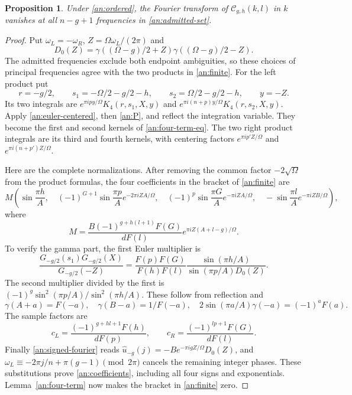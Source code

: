 \documentclass[11pt]{article}
\numberwithin{equation}{section}
\newtheorem{proposition}[theorem]{Proposition}
\theoremstyle{definition}
\theoremstyle{remark}
\begin{document}
\begin{proposition}\label{an:admitted}
Under \eqref{an:ordered}, the Fourier transform of
$\mathcal C_{g,h}(k,l)$ in $k$ vanishes at all $n-g+1$ frequencies
in \eqref{an:admitted-set}.
\end{proposition}

\begin{proof}
Put $\omega_L=-\omega_R$, $Z=\Omega\omega_L/(2\pi)$ and
\[
 D_0(Z)=\gamma((\Omega-g)/2+Z)\gamma((\Omega-g)/2-Z).
\]
The admitted frequencies exclude both endpoint ambiguities, so these
choices of principal frequencies agree with the two products in
\eqref{an:finite}.  For the left product put
\[
 r=-g/2,\qquad s_1=-\Omega/2-g/2-h,\qquad
 s_2=\Omega/2-g/2-h,\qquad y=-Z.
\]
Its two integrals are
$e^{\pi ipy/\Omega}K_4(r,s_1,X,y)$ and
$e^{\pi i(n+p)y/\Omega}K_4(r,s_2,X,y)$.
Apply \eqref{an:euler-centered}, then \eqref{an:P}, and reflect
the integration variable.  They become the first and second kernels
of \eqref{an:four-term-eq}.  The two right product integrals are
its third and fourth kernels, with centering factors
$e^{\pi ip'Z/\Omega}$ and $e^{\pi i(n+p')Z/\Omega}$.

Here are the complete normalizations.  After removing the common
factor $-2\sqrt\Omega$ from the product formulas, the four
coefficients in the bracket of \eqref{an:finite} are
\begin{equation}
 M\left(
 \sin\frac{\pi h}{A},\quad
 (-1)^{G+1}\sin\frac{\pi p}{A}e^{-2\pi iZA/\Omega},\quad
 (-1)^p\sin\frac{\pi G}{A}e^{-\pi iZA/\Omega},\quad
 -\sin\frac{\pi l}{A}e^{-\pi iZB/\Omega}\right),
 \label{an:coefficients}
\end{equation}
where
\[
 M=\frac{B(-1)^{g+h(l+1)}F(G)}{dF(l)}
                          e^{\pi iZ(A+l-g)/\Omega}.
\]
To verify the gamma part, the first Euler multiplier is
\[
 \frac{G_{-g/2}(s_1)G_{-g/2}(X)}{G_{-g/2}(-Z)}
 =\frac{F(p)F(G)}{F(h)F(l)}
       \frac{\sin(\pi h/A)}{\sin(\pi p/A)D_0(Z)}.
\]
The second multiplier divided by the first is
$(-1)^g\sin^2(\pi p/A)/\sin^2(\pi h/A)$.
These follow from reflection and
\[
 \gamma(A+a)=F(-a),\quad \gamma(B-a)=1/F(-a),\quad
 2\sin(\pi a/A)\gamma(-a)=(-1)^aF(a).
\]
The sample factors are
\[
 c_L=\frac{(-1)^{g+hl+1}F(h)}{dF(p)},\qquad
 c_R=\frac{(-1)^{lp+1}F(G)}{dF(l)}.
\]
Finally \eqref{an:signed-fourier} reads
$\widehat u_{-g}(j)=-B e^{-\pi igZ/\Omega}D_0(Z)$, and
$\omega_L\equiv-2\pi j/n+\pi(g-1)\pmod{2\pi}$
cancels the remaining integer phases.  These substitutions prove
\eqref{an:coefficients}, including all four signs and exponentials.
Lemma~\ref{an:four-term} now makes the bracket in
\eqref{an:finite} zero.
\end{proof}
\end{document}
